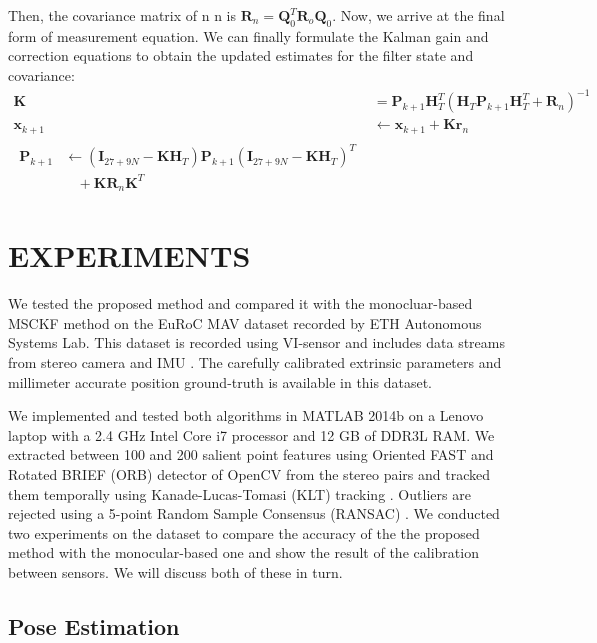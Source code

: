 \documentclass[a4paper, 10pt, conference]{ieeeconf}      %
\begin{document}
Then, the covariance matrix of n
n is $ \bm R_n = \bm Q_0^T \bm R_o \bm Q_0 $.
Now, we arrive at  the final form of measurement equation. We can finally  formulate the Kalman gain and correction
equations to obtain the updated estimates for the filter state and covariance:
\begin{align}
\bm K &= \bm P_{k+1}\bm H_T^T																		(\bm H_T \bm P_{k+1} \bm H_T^T + \bm R_n )^{-1} \\
 \bm {x}_{k+1} &  \leftarrow  \bm {x}_{k+1} + \bm K \bm r_n \\
  \begin{split}
  \bm P_{k+1} &  \leftarrow (\bm I_{27+9N}-\bm K \bm H_T) \bm
  P_{k+1}(\bm I_{27+9N}-\bm K \bm H_T)^T \\
 & \ \ \ \ +\bm K \bm R_n \bm K^T
  \end{split}
\end{align}


	
\section{EXPERIMENTS}

We tested the proposed method and compared it with the monocluar-based MSCKF method on the  EuRoC MAV dataset recorded by ETH Autonomous Systems Lab. This dataset is recorded using VI-sensor and includes data streams from stereo camera and IMU \cite{Burri25012016}. The carefully calibrated extrinsic parameters and millimeter accurate position ground-truth is available in this dataset.
 
We implemented and tested both algorithms in MATLAB
2014b on a Lenovo laptop with a 2.4 GHz
Intel Core i7 processor and 12 GB of DDR3L RAM. We extracted between 100 and 200 salient point features  using Oriented FAST and Rotated BRIEF (ORB) detector \cite{rublee2011orb} of OpenCV \cite{opencv_library} from the stereo pairs and tracked them temporally using Kanade-Lucas-Tomasi (KLT) tracking \cite{birchfield2007klt}.  Outliers are rejected 
using a 5-point  Random Sample Consensus (RANSAC) . We conducted two experiments on the dataset to compare the accuracy of the the proposed method with the monocular-based one and show the result of the calibration between sensors. We will discuss both of these in turn.



\subsection{Pose Estimation} 
\end{document}

